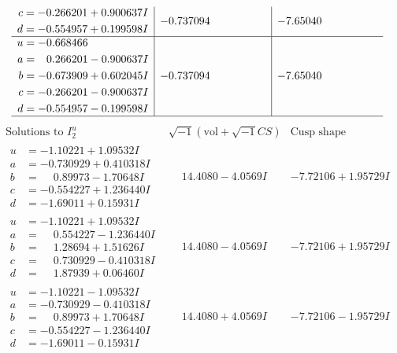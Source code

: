 \documentclass[1p]{elsarticle_modified}
\theoremstyle{definition}
\newcommand{\I}{\sqrt{-1}}
\begin{document}
$$\begin{array}{c|c|c}
\begin{aligned}
c &= -0.266201 + 0.900637 I \\
d &= -0.554957 + 0.199598 I\end{aligned}
 & -0.737094\phantom{ +0.000000I} & -7.65040\phantom{ +0.000000I} \\ \hline\begin{aligned}
u &= -0.668466\phantom{ +0.000000I} \\
a &= \phantom{-}0.266201 - 0.900637 I \\
b &= -0.673909 + 0.602045 I \\
c &= -0.266201 - 0.900637 I \\
d &= -0.554957 - 0.199598 I\end{aligned}
 & -0.737094\phantom{ +0.000000I} & -7.65040\phantom{ +0.000000I}\\
 \hline 
 \end{array}$$\newpage$$\begin{array}{c|c|c}  
\text{Solutions to }I^u_{2}& \I (\text{vol} + \sqrt{-1}CS) & \text{Cusp shape}\\
 \hline 
\begin{aligned}
u &= -1.10221 + 1.09532 I \\
a &= -0.730929 + 0.410318 I \\
b &= \phantom{-}0.89973 - 1.70648 I \\
c &= -0.554227 + 1.236440 I \\
d &= -1.69011 + 0.15931 I\end{aligned}
 & \phantom{-}14.4080 - 4.0569 I & -7.72106 + 1.95729 I \\ \hline\begin{aligned}
u &= -1.10221 + 1.09532 I \\
a &= \phantom{-}0.554227 - 1.236440 I \\
b &= \phantom{-}1.28694 + 1.51626 I \\
c &= \phantom{-}0.730929 - 0.410318 I \\
d &= \phantom{-}1.87939 + 0.06460 I\end{aligned}
 & \phantom{-}14.4080 - 4.0569 I & -7.72106 + 1.95729 I \\ \hline\begin{aligned}
u &= -1.10221 - 1.09532 I \\
a &= -0.730929 - 0.410318 I \\
b &= \phantom{-}0.89973 + 1.70648 I \\
c &= -0.554227 - 1.236440 I \\
d &= -1.69011 - 0.15931 I\end{aligned}
 & \phantom{-}14.4080 + 4.0569 I & -7.72106 - 1.95729 I \\ \hline\begin{aligned}

\end{aligned}
\end{array}$$
\end{document}
